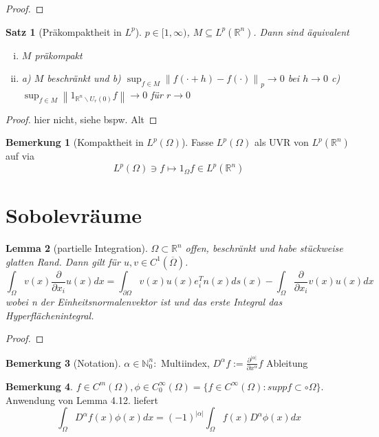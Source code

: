 \documentclass[ngerman]{report}
\theoremstyle{plain}%
\newtheorem{thm}{Satz}[chapter]
\newtheorem{lemma}[thm]{Lemma}
\theoremstyle{definition}%
\theoremstyle{myStyle}
\newtheorem{bem}[thm]{Bemerkung}
\newtheorem*{bem*}{Bemerkung}
\newcommand{\R}{\mathbb{R}}
\newcommand{\N}{\mathbb{N}}
\newcommand{\norm}[1]{\left \|#1\right\| }
\newcommand{\ov}[1]{\overline{#1}}
\begin{document}
	\begin{proof}
	\end{proof}

	\begin{thm}[Präkompaktheit in $L^p$]
		$p\in[1,\infty)$, $M \subseteq L^p(\R^n)$. Dann sind äquivalent
		\begin{enumerate}[(i)]
			\item $M$ präkompakt
			\item a) $M$ beschränkt und 
				b) $\sup_{f\in M} \norm{f(\cdot + h) - f(\cdot)}_p \to 0$ bei $h\to 0$
				c) $\sup_{f\in M} \norm{1_{\R^n\backslash U_r(0)}f}\to 0$ für $r\to 0$
		\end{enumerate}
	\end{thm}
	\begin{proof}
		hier nicht, siehe bspw. Alt	
	\end{proof}

	\begin{bem*}[Kompaktheit in $L^p(\Omega)$]
		Fasse $L^p(\Omega)$ als UVR von $L^p(\R^n)$ auf via
			$$ L^p(\Omega) \ni f \mapsto 1_\Omega f \in L^p(\R^n)$$
	\end{bem*}

	\section{Sobolevräume}

		\begin{lemma}[partielle Integration]
			$\Omega \subset \R^n$ offen, beschränkt und habe stückweise glatten Rand. Dann gilt für $u,v \in C^1(\ov{\Omega})$.
				$$\int_\Omega v(x) \frac{\partial}{\partial x_i} u(x) dx = 
				\int_{\partial \Omega} v(x)u(x) e_i^T n(x) ds(x) - \int_\Omega \frac{\partial}{\partial x_i} v(x) u(x) dx$$
				wobei n der Einheitsnormalenvektor ist und das erste Integral das Hyperflächenintegral.
		\end{lemma}
		\begin{proof}
		\end{proof}

	\begin{bem}[Notation]
		$\alpha \in \N_0^n:$ Multiindex, $D^\alpha f := \frac{\partial^|\alpha|}{\partial x^\alpha}f$ Ableitung
	\end{bem}

	\begin{bem}
		$f\in C^m(\Omega), \phi\in C_0^\infty(\Omega) = \{f\in C^\infty(\Omega): suppf\subset \circ\Omega\}.$ Anwendung von Lemma 4.12. liefert 
		 $$ \int_\Omega D^\alpha f(x) \phi(x) dx = (-1)^{|\alpha|}\int_\Omega f(x) D^\alpha \phi(x) dx$$ 
	\end{bem}
\end{document}
